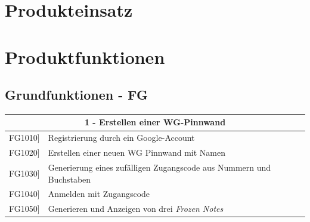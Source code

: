 \documentclass[a4paper]{scrreprt}
\begin{document}
    \chapter{Produkteinsatz}
        

    \chapter{Produktfunktionen}
    		\section{Grundfunktionen - FG}
    		
    		\begin{table}[h!]
    			\centering
    			\label{my-label}
    			\begin{tabular}{p{2cm}p{12cm}}
    				
    				\multicolumn{2}{c}{\textbf{1 - Erstellen einer WG-Pinnwand}} \\ \hline
    				\centering{[}FG1010{]} & Registrierung durch ein Google-Account\\
    				\centering{[}FG1020{]}& Erstellen einer neuen WG Pinnwand mit Namen                                 \\
    				\centering{[}FG1030{]}& Generierung eines zufälligen Zugangscode aus Nummern und Buchstaben\\ 
    				\centering{[}FG1040{]}& Anmelden mit Zugangscode\\ 
    				\centering{[}FG1050{]}& Generieren und Anzeigen von drei \textit{Frozen Notes}\\ 
    				\hline
    			\end{tabular}
    		\end{table}
    		
    		\vspace{5mm}
    		
\end{document}
